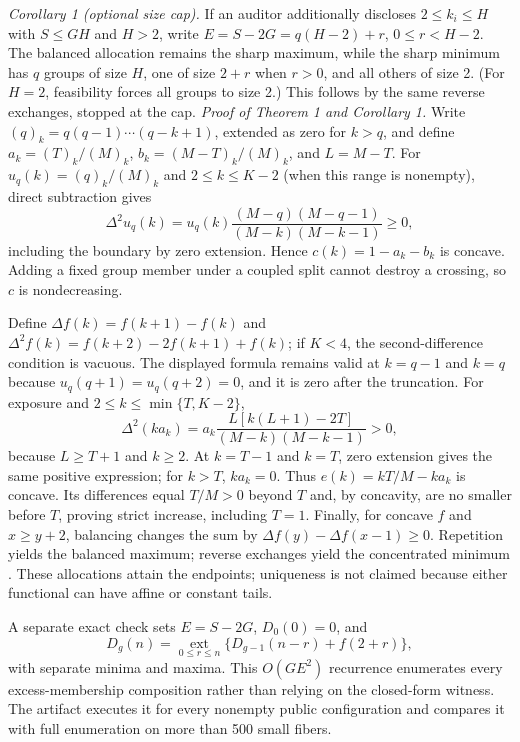 \documentclass[conference,10pt]{IEEEtran}
\begin{document}
\noindent\emph{Corollary 1 (optional size cap).} If an auditor additionally discloses $2\leq k_i\leq H$ with $S\leq GH$ and $H>2$, write $E=S-2G=q(H-2)+r$, $0\leq r<H-2$. The balanced allocation remains the sharp maximum, while the sharp minimum has $q$ groups of size $H$, one of size $2+r$ when $r>0$, and all others of size 2. (For $H=2$, feasibility forces all groups to size 2.) This follows by the same reverse exchanges, stopped at the cap.
\noindent\emph{Proof of Theorem 1 and Corollary 1.} Write $(q)_k=q(q-1)\cdots(q-k+1)$, extended as zero for $k>q$, and define $a_k=(T)_k/(M)_k$, $b_k=(M-T)_k/(M)_k$, and $L=M-T$. For $u_q(k)=(q)_k/(M)_k$ and $2\leq k\leq K-2$ (when this range is nonempty), direct subtraction gives
\begin{equation}
\Delta^2u_q(k)=u_q(k)\frac{(M-q)(M-q-1)}{(M-k)(M-k-1)}\geq0,
\end{equation}
including the boundary by zero extension. Hence $c(k)=1-a_k-b_k$ is concave. Adding a fixed group member under a coupled split cannot destroy a crossing, so $c$ is nondecreasing.

Define $\Delta f(k)=f(k+1)-f(k)$ and $\Delta^2f(k)=f(k+2)-2f(k+1)+f(k)$; if $K<4$, the second-difference condition is vacuous. The displayed formula remains valid at $k=q-1$ and $k=q$ because $u_q(q+1)=u_q(q+2)=0$, and it is zero after the truncation. For exposure and $2\leq k\leq\min\{T,K-2\}$,
\begin{equation}
\Delta^2(ka_k)=a_k\frac{L[k(L+1)-2T]}{(M-k)(M-k-1)}>0,
\end{equation}
because $L\geq T+1$ and $k\geq2$. At $k=T-1$ and $k=T$, zero extension gives the same positive expression; for $k>T$, $ka_k=0$. Thus $e(k)=kT/M-ka_k$ is concave. Its differences equal $T/M>0$ beyond $T$ and, by concavity, are no smaller before $T$, proving strict increase, including $T=1$. Finally, for concave $f$ and $x\geq y+2$, balancing changes the sum by $\Delta f(y)-\Delta f(x-1)\geq0$. Repetition yields the balanced maximum; reverse exchanges yield the concentrated minimum \cite{marshall2011}. These allocations attain the endpoints; uniqueness is not claimed because either functional can have affine or constant tails.

A separate exact check sets $E=S-2G$, $D_0(0)=0$, and
\begin{equation}
D_g(n)=\underset{0\leq r\leq n}{\operatorname{ext}}
\{D_{g-1}(n-r)+f(2+r)\},
\end{equation}
with separate minima and maxima. This $O(GE^2)$ recurrence enumerates every excess-membership composition rather than relying on the closed-form witness. The artifact executes it for every nonempty public configuration and compares it with full enumeration on more than 500 small fibers.
\end{document}

